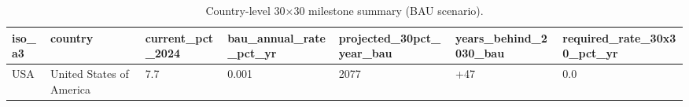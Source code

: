 \begin{table}[htbp]
\centering
\small
\begin{tabular}{lllllll}
\hline
iso\_a3 & country & current\_pct\_2024 & bau\_annual\_rate\_pct\_yr & projected\_30pct\_year\_bau & years\_behind\_2030\_bau & required\_rate\_30x30\_pct\_yr \\
\hline
USA & United States of America & 7.7 & 0.001 & 2077 & +47 & 0.0 \\
\hline
\end{tabular}
\caption{Country-level 30×30 milestone summary (BAU scenario).}
\label{tab:pathway_country}
\end{table}